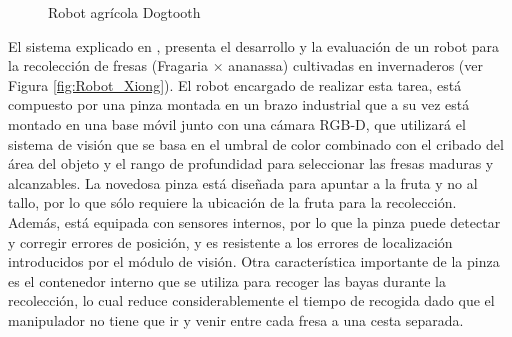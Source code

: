 \begin{figure}[H]
    \begin{center}
      \subcapcentertrue
      \hspace{2mm}
    \end{center}
    \caption{Robot agrícola Dogtooth}
    \label{fig:Dogtooth}
\end{figure}

El sistema explicado en \cite{Xiong19}, presenta el desarrollo y la evaluación de un robot para la recolección de fresas (Fragaria × ananassa) cultivadas en invernaderos (ver Figura \ref{fig:Robot_Xiong}). El robot encargado de realizar esta tarea, está compuesto por una pinza montada en un brazo industrial que a su vez está montado en una base móvil junto con una cámara RGB-D, que utilizará el sistema de visión que se basa en el umbral de color combinado con el cribado del área del objeto y el rango de profundidad para seleccionar las fresas maduras y alcanzables. La novedosa pinza está diseñada para apuntar a la fruta y no al tallo, por lo que sólo requiere la ubicación de la fruta para la recolección. Además, está equipada con sensores internos, por lo que la pinza puede detectar y corregir errores de posición, y es resistente a los errores de localización introducidos por el módulo de visión. Otra característica importante de la pinza es el contenedor interno que se utiliza para recoger las bayas durante la recolección, lo cual reduce considerablemente el tiempo de recogida dado que el manipulador no tiene que ir y venir entre cada fresa a una cesta separada.

